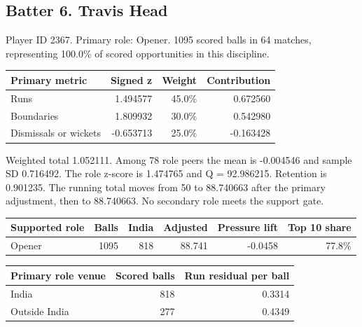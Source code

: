 \clearpage

\subsection{Batter 6. Travis Head}

Player ID 2367. Primary role: Opener. 1095 scored balls in 64 matches, representing 100.0\% of scored opportunities in this discipline.

\begin{center}
\begin{tabularx}{\linewidth}{>{\raggedright\arraybackslash}Xrrr}
\toprule
Primary metric & Signed z & Weight & Contribution \\
\midrule
Runs & 1.494577 & 45.0\% & 0.672560 \\
Boundaries & 1.809932 & 30.0\% & 0.542980 \\
Dismissals or wickets & -0.653713 & 25.0\% & -0.163428 \\
\bottomrule
\end{tabularx}
\end{center}

Weighted total 1.052111. Among 78 role peers the mean is -0.004546 and sample SD 0.716492. The role z-score is 1.474765 and Q = 92.986215. Retention is 0.901235. The running total moves from 50 to 88.740663 after the primary adjustment, then to 88.740663. No secondary role meets the support gate.

\begin{center}
\begin{tabularx}{\linewidth}{>{\raggedright\arraybackslash}Xrrrrr}
\toprule
Supported role & Balls & India & Adjusted & Pressure lift & Top 10 share \\
\midrule
Opener & 1095 & 818 & 88.741 & -0.0458 & 77.8\% \\
\bottomrule
\end{tabularx}
\end{center}

\begin{center}
\begin{tabularx}{\linewidth}{>{\raggedright\arraybackslash}Xrr}
\toprule
Primary role venue & Scored balls & Run residual per ball \\
\midrule
India & 818 & 0.3314 \\
Outside India & 277 & 0.4349 \\
\bottomrule
\end{tabularx}
\end{center}

